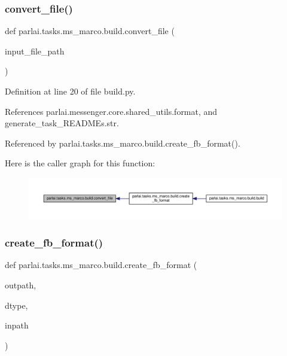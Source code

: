 \subsubsection{\texorpdfstring{convert\+\_\+file()}{convert\_file()}}
{\footnotesize\ttfamily def parlai.\+tasks.\+ms\+\_\+marco.\+build.\+convert\+\_\+file (\begin{DoxyParamCaption}\item[{}]{input\+\_\+file\+\_\+path }\end{DoxyParamCaption})}



Definition at line 20 of file build.\+py.



References parlai.\+messenger.\+core.\+shared\+\_\+utils.\+format, and generate\+\_\+task\+\_\+\+R\+E\+A\+D\+M\+Es.\+str.



Referenced by parlai.\+tasks.\+ms\+\_\+marco.\+build.\+create\+\_\+fb\+\_\+format().

Here is the caller graph for this function\+:
\nopagebreak
\begin{figure}[H]
\begin{center}
\leavevmode
\includegraphics[width=350pt]{namespaceparlai_1_1tasks_1_1ms__marco_1_1build_ac19db5d0ad4ba8559f6aca64f2fe192b_icgraph}
\end{center}
\end{figure}
\mbox{\label{namespaceparlai_1_1tasks_1_1ms__marco_1_1build_ac3cdd4cc2ccd3e9551ddd0349b94d537}} 
\subsubsection{\texorpdfstring{create\+\_\+fb\+\_\+format()}{create\_fb\_format()}}
{\footnotesize\ttfamily def parlai.\+tasks.\+ms\+\_\+marco.\+build.\+create\+\_\+fb\+\_\+format (\begin{DoxyParamCaption}\item[{}]{outpath,  }\item[{}]{dtype,  }\item[{}]{inpath }\end{DoxyParamCaption})}



